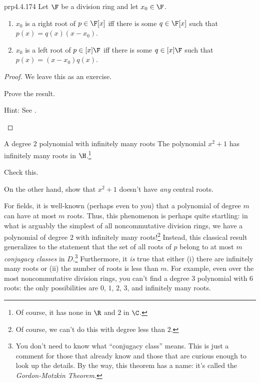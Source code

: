 \begin{prp}{}{prp4.4.174}
	Let $\F$ be a division ring and let $x_0\in \F$.
	\begin{enumerate}
		\item $x_0$ is a right root of $p\in \F[x]$ iff there is some $q\in \F [x]$ such that $p(x)=q(x)(x-x_0)$.
		\item $x_0$ is a left root of $p\in [x]\F$ iff there is some $q\in [x]\F$ such that $p(x)=(x-x_0)q(x)$.
	\end{enumerate}
	\begin{proof}
		We leave this as an exercise.
		\begin{exr}[breakable=false]{}{}
			Prove the result.
			\begin{rmk}
				Hint:  See \cite[Proposition 16.2]{Lam}.
			\end{rmk}
		\end{exr}
	\end{proof}
\end{prp}
\begin{exm}{A degree $2$ polynomial with infinitely many roots}{}
	The polynomial $x^2+1$ has infinitely many roots in $\H$.\footnote{Of course, it has none in $\R$ and $2$ in $\C$.}
	\begin{exr}[breakable=false]{}{}
		Check this.
	\end{exr}
	\begin{exr}[breakable=false]{}{}
		On the other hand, show that $x^2+1$ doesn't have \emph{any} central roots.
	\end{exr}
	\begin{rmk}
		For fields, it is well-known (perhaps even to you) that a polynomial of degree $m$ can have at most $m$ roots.  Thus, this phenomenon is perhaps quite startling:  in what is arguably the simplest of all noncommutative division rings, we have a polynomial of degree $2$ with infinitely many roots!\footnote{Of course, we can't do this with degree less than $2$.}  Instead, this classical result generalizes to the statement that the set of all roots of $p$ belong to at most $m$ \emph{conjugacy classes} in $D$.\footnote{You don't need to know what ``conjugacy class'' means.  This is just a comment for those that already know and those that are curious enough to look up the details.  By the way, this theorem has a name:  it's called the \emph{Gordon-Motzkin Theorem}.}  Furthermore, it \emph{is} true that either (i) there are infinitely many roots or (ii) the number of roots is less than $m$.  For example, even over the most noncommutative division rings, you can't find a degree $3$ polynomial with $6$ roots:  the only possibilities are $0$, $1$, $2$, $3$, and infinitely many roots.
	\end{rmk}
\end{exm}

